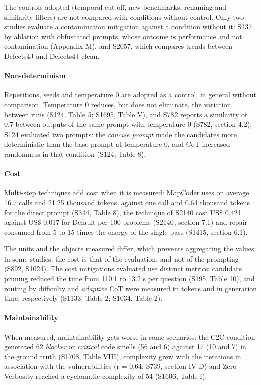 The controls adopted (temporal cut-off, new benchmarks, renaming and similarity filters) are not compared with conditions without control.
Only two studies evaluate a contamination mitigation against a condition without it: S137, by ablation with obfuscated prompts, whose outcome is performance and not contamination (Appendix M), and S2057, which compares trends between Defects4J and Defects4J-clean.

\paragraph{Non-determinism}
Repetitions, seeds and temperature 0 are adopted as a control, in general without comparison.
Temperature 0 reduces, but does not eliminate, the variation between runs (S124, Table 5; S1695, Table V), and S782 reports a similarity of 0.7 between outputs of the same prompt with temperature 0 (S782, section 4.2); S124 evaluated two prompts: the \textit{concise prompt} made the candidates more deterministic than the base prompt at temperature 0, and CoT increased randomness in that condition (S124, Table 8).

\paragraph{Cost}
Multi-step techniques add cost when it is measured: MapCoder uses on average 16.7 calls and 21.25 thousand tokens, against one call and 0.64 thousand tokens for the direct prompt (S344, Table 8), the technique of S2140 cost US\$ 0.421 against US\$ 0.017 for Default per 100 problems (S2140, section 7.1) and repair consumed from 5 to 15 times the energy of the single pass (S1415, section 6.1).

The units and the objects measured differ, which prevents aggregating the values; in some studies, the cost is that of the evaluation, and not of the prompting (S892, S1024).
The cost mitigations evaluated use distinct metrics: candidate pruning reduced the time from 110.1 to 13.2 s per question (S195, Table 10), and routing by difficulty and \textit{adaptive} CoT were measured in tokens and in generation time, respectively (S1133, Table 2; S1034, Table 2).

\paragraph{Maintainability}
When measured, maintainability gets worse in some scenarios: the C2C condition generated 62 \textit{blocker} or \textit{critical} code smells (56 and 6) against 17 (10 and 7) in the ground truth (S1708, Table VIII), complexity grew with the iterations in association with the vulnerabilities (r = 0.64; S739, section IV-D) and Zero-Verbosity reached a cyclomatic complexity of 54 (S1606, Table I).


